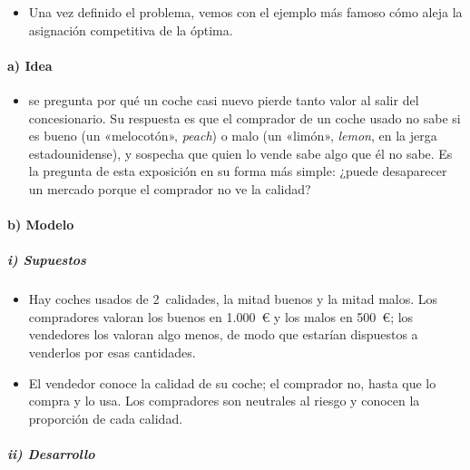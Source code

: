\documentclass[11pt]{article}
\begin{document}
\begin{itemize}
\item Una vez definido el problema, vemos con el ejemplo más famoso cómo aleja la asignación competitiva de la óptima.
\end{itemize}

\paragraph{a) Idea}

\begin{itemize}
\item \textcite{Akerlof1970Market} se pregunta por qué un coche casi nuevo pierde tanto valor al salir del concesionario. Su respuesta es que el comprador de un coche usado no sabe si es bueno (un «melocotón», \emph{peach}) o malo (un «limón», \emph{lemon}, en la jerga estadounidense), y sospecha que quien lo vende sabe algo que él no sabe. Es la pregunta de esta exposición en su forma más simple: ¿puede desaparecer un mercado porque el comprador no ve la calidad?
\end{itemize}

\paragraph{b) Modelo}

\subparagraph{i) Supuestos}

\begin{itemize}
\item Hay coches usados de 2~calidades, la mitad buenos y la mitad malos. Los compradores valoran los buenos en 1.000~€ y los malos en 500~€; los vendedores los valoran algo menos, de modo que estarían dispuestos a venderlos por esas cantidades.
\item El vendedor conoce la calidad de su coche; el comprador no, hasta que lo compra y lo usa. Los compradores son neutrales al riesgo y conocen la proporción de cada calidad.
\end{itemize}

\subparagraph{ii) Desarrollo}
\end{document}
